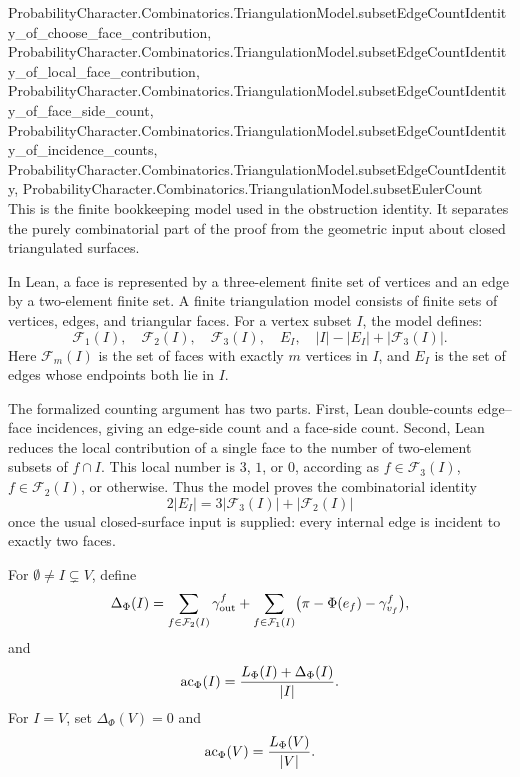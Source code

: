 \begin{definition}
{ProbabilityCharacter.Combinatorics.TriangulationModel.subsetEdgeCountIdentity_of_choose_face_contribution,
ProbabilityCharacter.Combinatorics.TriangulationModel.subsetEdgeCountIdentity_of_local_face_contribution,
ProbabilityCharacter.Combinatorics.TriangulationModel.subsetEdgeCountIdentity_of_face_side_count,
ProbabilityCharacter.Combinatorics.TriangulationModel.subsetEdgeCountIdentity_of_incidence_counts,
ProbabilityCharacter.Combinatorics.TriangulationModel.subsetEdgeCountIdentity,
ProbabilityCharacter.Combinatorics.TriangulationModel.subsetEulerCount}\leanok
This is the finite bookkeeping model used in the obstruction identity.  It
separates the purely combinatorial part of the proof from the geometric input
about closed triangulated surfaces.

In Lean, a face is represented by a three-element finite set of vertices and
an edge by a two-element finite set.  A finite triangulation model consists of
finite sets of vertices, edges, and triangular faces.  For a vertex subset
\(I\), the model defines:
\[
  \mathcal F_1(I),\quad \mathcal F_2(I),\quad \mathcal F_3(I),\quad
  E_I,\quad |I|-|E_I|+|\mathcal F_3(I)|.
\]
Here \(\mathcal F_m(I)\) is the set of faces with exactly \(m\) vertices in
\(I\), and \(E_I\) is the set of edges whose endpoints both lie in \(I\).

The formalized counting argument has two parts.  First, Lean double-counts
edge--face incidences, giving an edge-side count and a face-side count.
Second, Lean reduces the local contribution of a single face to the number
of two-element subsets of \(f\cap I\).  This local number is \(3\), \(1\), or
\(0\), according as \(f\in\mathcal F_3(I)\), \(f\in\mathcal F_2(I)\), or
otherwise.  Thus the model proves the combinatorial identity
\[
  2|E_I|=3|\mathcal F_3(I)|+|\mathcal F_2(I)|
\]
once the usual closed-surface input is supplied: every internal edge is
incident to exactly two faces.
\end{definition}

\begin{definition}\label{def:boundary-corrected-average}
\leanok
For $\emptyset\ne I\subsetneq V$, define
\[
  \Delta_\Phi(I)
  =
  \sum_{f\in\mathcal F_2(I)}\gamma_{\mathrm{out}}^f
  +
  \sum_{f\in\mathcal F_1(I)}
    \bigl(\pi-\Phi(e_f)-\gamma_{v_f}^f\bigr),
\]
and
\[
  \operatorname{ac}_\Phi(I)=\frac{L_\Phi(I)+\Delta_\Phi(I)}{|I|}.
\]
For $I=V$, set $\Delta_\Phi(V)=0$ and
\[
  \operatorname{ac}_\Phi(V)=\frac{L_\Phi(V)}{|V|}.
\]
\end{definition}

